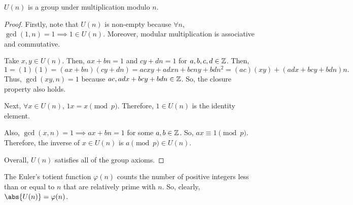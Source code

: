 \documentclass[11pt]{penrose}
\begin{document}
\begin{nthm}
    $U(n)$ is a group under multiplication modulo $n$.
\end{nthm}
\begin{proof}
    Firstly, note that $U(n)$ is non-empty because $\forall n$, $\gcd(1,n) = 1 \implies 1 \in U(n)$. Moreover, modular multiplication is associative and commutative.

    Take $x,y \in U(n)$. Then, $ax+bn = 1$ and $cy + dn = 1$ for $a,b,c,d \in \mathbb{Z}$. Then,
    \begin{equation*}
        1
        = (1)(1)
        = (ax+bn)(cy+dn)
        = acxy + adxn + bcny + bdn^{2}
        = (ac)(xy) + (adx + bcy + bdn)n.
    \end{equation*}
    Thus, $\gcd(xy, n) = 1$ because $ac, adx + bcy + bdn \in \mathbb{Z}$. So, the closure property also holds.

    Next, $\forall x \in U(n)$, $1 x = x \pmod p$. Therefore, $1 \in U(n)$ is the identity element.

    Also, $\gcd(x,n) = 1 \implies ax + bn = 1$ for some $a, b \in \mathbb{Z}$. So, $ax \equiv 1 \pmod p$. Therefore, the inverse of $x \in U(n)$ is $a \pmod p \in U(n)$.


    Overall, $U(n)$ satisfies all of the group axioms.
\end{proof}

\begin{remark}
    The Euler's totient function $\varphi(n)$ counts the number of positive integers less than or equal to $n$ that are relatively prime with $n$. So, clearly, $\abs{U(n)} = \varphi(n)$.
\end{remark}
\end{document}

